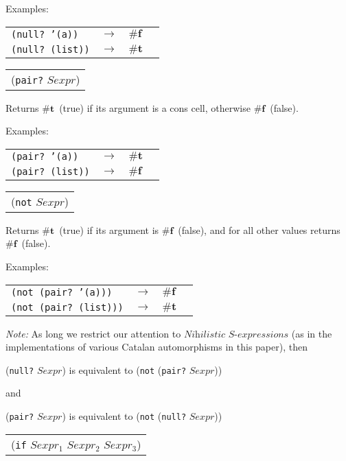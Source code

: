 \documentclass[11pt]{article} %
\newcommand{\scmsym}[1]{{\tt{#1}}}
\newcommand{\scmetavar}[1]{\ensuremath{\mathit{#1}}}
\newcommand{\scmcode}[1]{{\tt{#1}}}
\newenvironment{scmsimplefun}{\item[] \begin{tabular}{l}}{\\
\end{tabular}}
\newenvironment{scmexample}{Examples:\\
\begin{tabular}{l l l p{5cm}}}{\end{tabular}}
\newenvironment{scmnote}{\item[]}{}
\newcommand{\nsexprs}{\ensuremath{\textit{Nihilistic~S-expressions}}\xspace}
\newcommand{\scmfalse}{\ensuremath{\mathbf{\#f}}\xspace}
\newcommand{\scmtrue}{\ensuremath{\mathbf{\#t}}\xspace}
\newcommand{\ra}{\ensuremath{\rightarrow}\xspace}
\begin{document}
\begin{description}
\begin{scmexample}
\scmcode{(null? '(a))} & \ra & \scmfalse\\

\scmcode{(null? (list))} & \ra & \scmtrue\\
\end{scmexample}


\begin{scmsimplefun}
(\scmsym{pair?} \scmetavar{Sexpr})
\end{scmsimplefun}

Returns \scmtrue~(true) if its argument is a cons cell,
otherwise \scmfalse~(false).

\begin{scmexample}
\scmcode{(pair? '(a))} & \ra & \scmtrue\\

\scmcode{(pair? (list))} & \ra & \scmfalse\\
\end{scmexample}


\begin{scmsimplefun}
(\scmsym{not} \scmetavar{Sexpr})
\end{scmsimplefun}

Returns \scmtrue~(true) if its argument is \scmfalse~(false),
and for all other values returns \scmfalse~(false).

\begin{scmexample}
\scmcode{(not (pair? '(a)))} & \ra & \scmfalse\\

\scmcode{(not (pair? (list)))} & \ra & \scmtrue\\
\end{scmexample}

\begin{scmnote}
\textit{Note:} As long we restrict our attention to \nsexprs
(as in the implementations of various Catalan automorphisms
in this paper), then

(\scmsym{null?} \scmetavar{Sexpr}) is equivalent to (\scmsym{not} (\scmsym{pair?} \scmetavar{Sexpr}))

and

(\scmsym{pair?} \scmetavar{Sexpr}) is equivalent to (\scmsym{not} (\scmsym{null?} \scmetavar{Sexpr}))
\end{scmnote}

\begin{scmsimplefun}
(\scmsym{if} \scmetavar{Sexpr_1} \scmetavar{Sexpr_2} \scmetavar{Sexpr_3})
\end{scmsimplefun}


\end{description}
\end{document}
